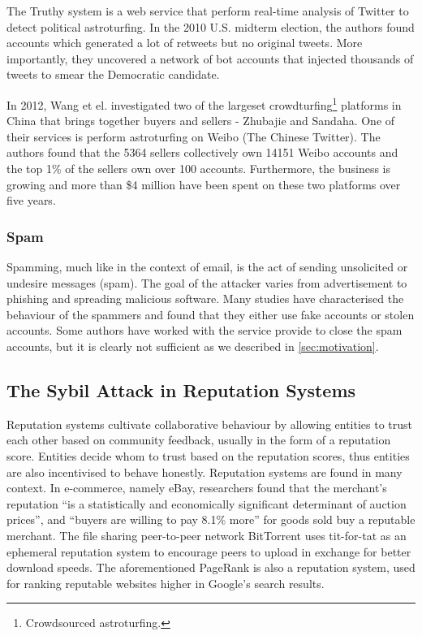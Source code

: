The Truthy system\cite{ratkiewicz2011truthy} is a web service that perform
real-time analysis of Twitter to detect political astroturfing. In the 2010
U.S. midterm election, the authors found accounts which generated a lot of
retweets but no original tweets. More importantly, they uncovered a network of
bot accounts that injected thousands of tweets to smear the Democratic candidate.

In 2012, Wang et el. investigated two of the largeset
crowdturfing\footnote{Crowdsourced astroturfing.} platforms in China that brings
together buyers and sellers - Zhubajie and Sandaha. One of their services is
perform astroturfing on Weibo (The Chinese Twitter). The authors found that the
5364 sellers collectively own 14151 Weibo accounts and the top 1\% of the
sellers own over 100 accounts. Furthermore, the business is growing and more
than \$4 million have been spent on these two platforms over five
years\cite{wang2012serf}.

\subsubsection{Spam}
Spamming, much like in the context of email, is the act of sending unsolicited
or undesire messages (spam). The goal of the attacker varies from advertisement
to phishing and spreading malicious software\cite{twittermalware1,
  twittermalware2}. Many studies have characterised the behaviour of the
spammers and found that they either use fake accounts or stolen
accounts\cite{stringhini2010detecting, yang2012analyzing, grier2010spam}. Some
authors have worked with the service provide to close the spam accounts, but it
is clearly not sufficient as we described in \autoref{sec:motivation}.


\subsection{The Sybil Attack in Reputation Systems}\label{sec:reputation-attack}
Reputation systems cultivate collaborative behaviour by allowing entities to
trust each other based on community feedback, usually in the form of a
reputation score. Entities decide whom to trust based on the reputation scores,
thus entities are also incentivised to behave honestly. Reputation systems are
found in many context. In e-commerce, namely eBay, researchers found that the
merchant's reputation ``is a statistically and economically significant
determinant of auction prices''\cite{houser2006reputation}, and ``buyers are
willing to pay 8.1\% more'' for goods sold buy a reputable
merchant\cite{resnick2006value}. The file sharing peer-to-peer network
BitTorrent uses tit-for-tat as an ephemeral reputation system to encourage peers
to upload in exchange for better download speeds\cite{cohen2003incentives}. The
aforementioned PageRank\cite{page1999pagerank} is also a reputation system, used
for ranking reputable websites higher in Google's search results.

